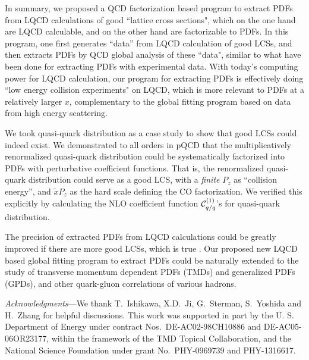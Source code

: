 \documentclass[twocolumn,aps,prl,superscriptaddress,nofootinbib,showpacs]{revtex4-1}
\newcommand{\sect}[1]{\noindent{\it \textbf{#1} ---}}
\begin{document}
\sect{Summary}
In summary, we proposed a QCD factorization based program to extract PDFs from LQCD calculations of good ``lattice cross sections", which on the one hand are LQCD calculable, and on the other hand are factorizable to PDFs. In this program, one first generates ``data'' from LQCD calculation of good LCSs, and then extracts PDFs by QCD global analysis of these ``data", similar to what have been done for extracting PDFs with experimental data. With today's computing power for LQCD calculation, our program for extracting PDFs is effectively doing ``low energy collision experiments" on LQCD, which is more relevant to PDFs at a relatively larger $x$, complementary to the global fitting program based on data from high energy scattering.

We took quasi-quark distribution as a case study to show that good LCSs could indeed exist. We demonstrated to all orders in pQCD that the multiplicatively renormalized quasi-quark distribution could be systematically factorized into PDFs with perturbative coefficient functions. That is, the renormalized quasi-quark distribution could serve as a good LCS, with a {\em finite} $P_z$ as ``collision energy'', and $\tilde{x} P_z$ as the hard scale defining the CO factorization.  We verified this explicitly by calculating the NLO coefficient function ${\cal C}^{(1)}_{q/q}$'s for quasi-quark distribution.

The precision of extracted PDFs from LQCD calculations could be greatly improved if there are more good LCSs, which is true \cite{Ma:2017pxb}.  Our proposed new LQCD based global fitting program to extract PDFs could be naturally extended to the study of transverse momentum dependent PDFs (TMDs) and generalized PDFs (GPDs), and other quark-gluon correlations of various hadrons.

{\it Acknowledgments}---We thank T.~Ishikawa, X.D.~Ji, G.~Sterman, S.~Yoshida and H.~Zhang for helpful discussions.  This work was supported in part by the U. S. Department of Energy under contract Nos.~DE-AC02-98CH10886 and DE-AC05-06OR23177, within the framework of the TMD Topical Collaboration, and the National Science Foundation under grant No.~PHY-0969739 and PHY-1316617.


\end{document}
